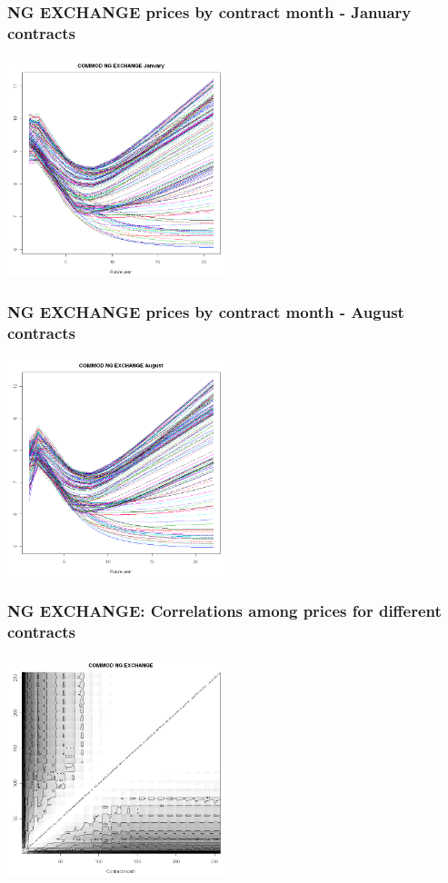 \documentclass[10pt]{beamer}
\begin{document}
\frame
{
  \frametitle{NG EXCHANGE prices by contract month - January contracts} 

\begin{center}
  \includegraphics[height=2.5in]{figures/henry06.png}
\end{center}
}

\frame
{
  \frametitle{NG EXCHANGE  prices by contract month - August contracts} 
\begin{center}
  \includegraphics[height=2.5in]{figures/henry05.png}
\end{center}
}

\frame
{
\frametitle{NG EXCHANGE: Correlations among prices for different contracts}
\begin{center}
  \includegraphics[height=2.5in]{figures/henry07.png}
\end{center}
}
\end{document}
